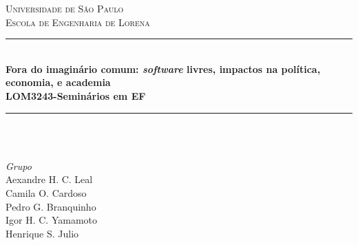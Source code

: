 \documentclass[12pt]{article}
\begin{document}
\begin{titlepage}

  \newcommand{\HRule}{\rule{\linewidth}{0.5mm}} %

  \center %


  \textsc{\LARGE Universidade de São Paulo}\\[1cm] %
  \textsc{\Large Escola de Engenharia de Lorena}\\[0.5cm] %


  \HRule \\[0.4cm]
  {\huge \bfseries Fora do imaginário comum: \textit{software} livres, impactos na política, economia, e academia\\[0.4cm] LOM3243-Seminários em EF}\\[0.4cm]
  \HRule \\[1.2cm]


  ~
  \begin{minipage}{0.4\textwidth}
    \begin{center} \large
      \emph{Grupo} \\
      Aexandre H. C. Leal \\%
      Camila O. Cardoso \\
      Pedro G. Branquinho \\
      Igor H. C. Yamamoto \\
      Henrique S. Julio \\
    \end{center}
  \end{minipage}\\[0.8cm]


\end{titlepage}
\end{document}
